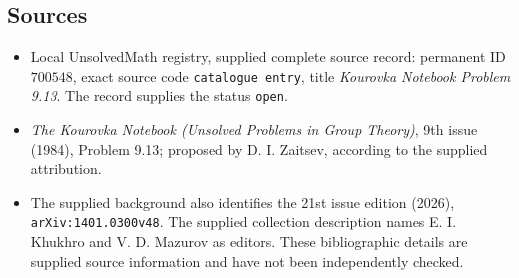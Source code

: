 \documentclass[11pt]{article}
\begin{document}
\subsection{Sources}
\begin{itemize}
\item Local UnsolvedMath registry, supplied complete source record: permanent ID \(700548\), exact source code \texttt{catalogue entry}, title \emph{Kourovka Notebook Problem 9.13}. The record supplies the status \texttt{open}.
\item \emph{The Kourovka Notebook (Unsolved Problems in Group Theory)}, 9th issue (1984), Problem 9.13; proposed by D. I. Zaitsev, according to the supplied attribution.
\item The supplied background also identifies the 21st issue edition (2026), \texttt{arXiv:1401.0300v48}. The supplied collection description names E. I. Khukhro and V. D. Mazurov as editors. These bibliographic details are supplied source information and have not been independently checked.
\end{itemize}
\end{document}
